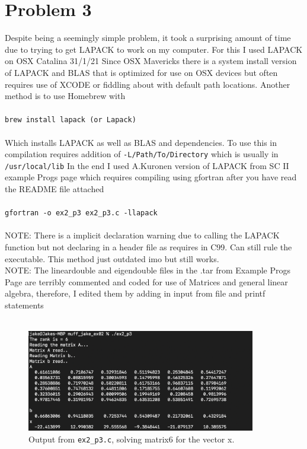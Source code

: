 \documentclass[12pt]{article}
\begin{document}
\section*{Problem 3}
Despite being a seemingly simple problem, it took a surprising amount of time due to trying to get LAPACK to work on my computer. For this I used LAPACK on OSX Catalina 31/1/21
Since OSX Mavericks there is a system install version of LAPACK and BLAS that is optimized for use on OSX devices but often requires use of XCODE or fiddling about with default path locations.
Another method is to use Homebrew with \\
\\
\lstinline{brew install lapack (or Lapack)} \\
\\
Which installs LAPACK as well as BLAS and dependencies. To use this in compilation requires addition of \lstinline{-L/Path/To/Directory} which is usually in \lstinline{/usr/local/lib}
In the end I used A.Kuronen version of LAPACK from SC II example Progs page which requires compiling 
using gfortran after you have read the README file attached \\
\\
\lstinline{gfortran -o ex2_p3 ex2_p3.c -llapack} \\
\\
NOTE: There is a implicit declaration warning due to calling the LAPACK function but not declaring in a header file as requires in C99. Can still rule the executable. This method just outdated imo but still works. \\
NOTE: The lineardouble and eigendouble files in the .tar from Example Progs Page are terribly commented and coded for use of Matrices and general linear algebra, therefore, I edited them by adding in input from file and printf statements \\
\\

\begin{figure}
    
    \includegraphics[width=10cm]{matrix6.png}
    \centering
    \caption{Output from \lstinline{ex2_p3.c}, solving matrix6 for the vector x. }

\end{figure}
\end{document}
